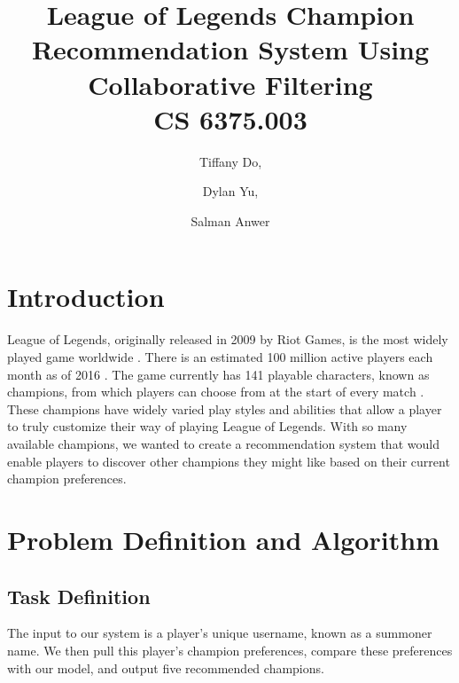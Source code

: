 \documentclass [11pt]{IEEEtran}
\title{League of Legends Champion Recommendation System Using Collaborative Filtering\\ {\large CS 6375.003}}
\author{Tiffany Do, \and Dylan Yu, \and Salman Anwer}
\begin{document}
\maketitle
\section{Introduction}
League of Legends, originally released in 2009 by Riot Games, is the most widely played game worldwide \cite{gaudiosi_2013}. There is an estimated 100 million active players each month as of 2016 \cite{volk_2016}. The game currently has 141 playable characters, known as champions, from which players can choose from at the start of every match \cite{champlist}. These champions have widely varied play styles and abilities that allow a player to truly customize their way of playing League of Legends. With so many available champions, we wanted to create a recommendation system that would enable players to discover other champions they might like based on their current champion preferences.

\section{Problem Definition and Algorithm}
\subsection{Task Definition}
The input to our system is a player’s unique username, known as a summoner name. We then pull this player’s champion preferences, compare these preferences with our model, and output five recommended champions.
\end{document}
